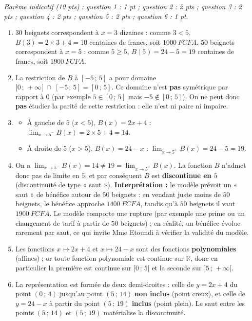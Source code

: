 \documentclass[11pt]{article}
\begin{document}
\begin{corrige}
\emph{Barème indicatif (10 pts) : question 1 : 1 pt ; question 2 : 2 pts ; question 3 : 2 pts ; question 4 : 2 pts ; question 5 : 2 pts ; question 6 : 1 pt.}
\begin{enumerate}
\item $30$ beignets correspondent à $x=3$ dizaines : comme $3<5$, $B(3)=2\times 3+4=10$ centaines de francs, soit $\SI{1000}{FCFA}$.
$50$ beignets correspondent à $x=5$ : comme $5\geq 5$, $B(5)=24-5=19$ centaines de francs, soit $\SI{1900}{FCFA}$.
\item La restriction de $B$ à $[-5\,;\,5]$ a pour domaine $[0\,;\,+\infty[\;\cap\;[-5\,;\,5]=[0\,;\,5]$. Ce domaine n'est \textbf{pas} symétrique par rapport à $0$ (par exemple $5\in[0\,;\,5]$ mais $-5\notin[0\,;\,5]$). On ne peut donc \textbf{pas} étudier la parité de cette restriction : elle n'est ni paire ni impaire.
\item \begin{itemize}
\item À gauche de $5$ ($x<5$), $B(x)=2x+4$ : $\displaystyle\lim_{x\to 5^-}B(x)=2\times 5+4=14$.
\item À droite de $5$ ($x>5$), $B(x)=24-x$ : $\displaystyle\lim_{x\to 5^+}B(x)=24-5=19$.
\end{itemize}
\item On a $\displaystyle\lim_{x\to 5^-}B(x)=14\neq 19=\lim_{x\to 5^+}B(x)$. La fonction $B$ n'admet donc pas de limite en $5$, et par conséquent $B$ est \textbf{discontinue en $5$} (discontinuité de type « saut »).
\textbf{Interprétation :} le modèle prévoit un « saut » de bénéfice autour de $50$ beignets : en vendant juste moins de $50$ beignets, le bénéfice approche $\SI{1400}{FCFA}$, tandis qu'à $50$ beignets il vaut $\SI{1900}{FCFA}$. Le modèle comporte une rupture (par exemple une prime ou un changement de tarif à partir de $50$ beignets) ; en réalité, un bénéfice évolue rarement par saut, ce qui invite Mme Etoundi à vérifier la validité du modèle.
\item Les fonctions $x\mapsto 2x+4$ et $x\mapsto 24-x$ sont des fonctions \textbf{polynomiales} (affines) ; or toute fonction polynomiale est continue sur $\mathbb{R}$, donc en particulier la première est continue sur $[0\,;\,5[$ et la seconde sur $]5\,;\,+\infty[$.
\item La représentation est formée de deux demi-droites : celle de $y=2x+4$ du point $(0\,;\,4)$ jusqu'au point $(5\,;\,14)$ \textbf{non inclus} (point creux), et celle de $y=24-x$ à partir du point $(5\,;\,19)$ \textbf{inclus} (point plein). Le saut entre les points $(5\,;\,14)$ et $(5\,;\,19)$ matérialise la discontinuité.

\end{enumerate}
\end{corrige}
\end{document}
